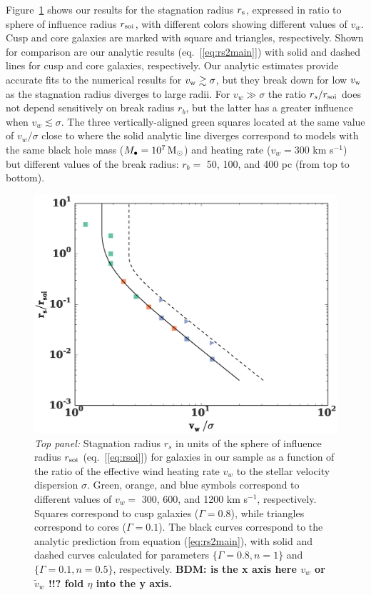 \documentclass[usenatbib,fleqn]{mn2e}
\newcommand{\rs}{r_s}
\newcommand{\vw}{\tilde{v}_{w}}
\newcommand{\Mbh}[1][]{M_{\bullet#1}}
\newcommand{\soi}{\rm soi}
\newcommand{\rsoi}{r_{\soi}}
\begin{document}
Figure~\ref{fig:stag} shows our results for the stagnation radius $r_{\rm s}$, expressed in ratio to sphere of influence radius $r_{\rm soi}$, with different colors showing different values of $v_{w}$.  Cusp and core galaxies are marked with square and triangles, respectively.  Shown for comparison are our analytic results (eq.~[\ref{eq:rs2main}]) with solid and dashed lines for cusp and core galaxies, respectively.  Our analytic estimates provide accurate fits to the numerical results for $v_{\rm w} \gtrsim \sigma$, but they break down for low $v_{\rm w}$ as the stagnation radius diverges to large radii.  For $v_{w} \gg \sigma$ the ratio $\rs/\rsoi$ does not depend sensitively on break radius $r_{b}$, but the latter has a greater influence when $v_{w} \lesssim \sigma$.  The three vertically-aligned green squares located at the same value of $v_{w}/\sigma$ close to where the solid analytic line diverges correspond to models with the same black hole mass ($\Mbh = 10^7 \Msun$) and heating rate ($v_w = 300$ km s$^{-1}$) but different values of the break radius: $r_{b} = $ 50, 100, and 400 pc (from top to bottom).  

\begin{figure}
  \includegraphics[width=\columnwidth]{rs.eps}
  \caption{\label{fig:stag} \emph{Top panel:} Stagnation radius
    $r_{s}$ in units of the sphere of influence radius $r_{\rm
      soi}$ (eq.~[\ref{eq:rsoi}]) for galaxies in our sample as a
    function of the ratio of the effective wind heating rate $v_{w}$
    to the stellar velocity dispersion $\sigma$.  Green, orange, and
    blue symbols correspond to different values of $v_{w} =$ 300, 600, and 1200 km s$^{-1}$,
    respectively.  Squares correspond to cusp galaxies ($\Gamma = 0.8$), while
    triangles correspond to cores ($\Gamma = 0.1$). The black curves correspond to the
    analytic prediction from equation (\ref{eq:rs2main}), with solid and dashed curves calculated for parameters $\{\Gamma=0.8, n=1\}$ and $\{\Gamma=0.1,n=0.5\}$, respectively.  {\bf BDM: is the x axis here $v_{w}$ or $\vw$ !!?  fold $\eta$ into the y axis. }}
\end{figure}
\end{document}
